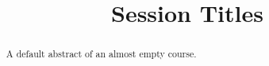 \documentclass{xourse}
\title{Session Titles}
\begin{document}
\begin{abstract}
    A default abstract of an almost empty course.
\end{abstract}
\maketitle

\beginSlides
{}
\end{document}
